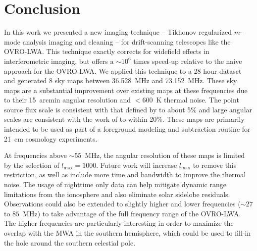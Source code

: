\documentclass[twocolumn]{aastex61}
\begin{document}

\section{Conclusion}\label{sec:conclusion}

In this work we presented a new imaging technique -- Tikhonov regularized $m$-mode analysis imaging
and cleaning -- for drift-scanning telescopes like the OVRO-LWA.  This technique exactly corrects
for widefield effects in interferometric imaging, but offers a $\sim10^6$ times speed-up relative to
the naive approach for the OVRO-LWA. We applied this technique to a 28 hour dataset and generated 8
sky maps between 36.528~MHz and 73.152~MHz. These sky maps are a substantial improvement over
existing maps at these frequencies due to their 15~arcmin angular resolution and $<600$~K thermal
noise. The point source flux scale is consistent with that defined by \citet{2012MNRAS.423L..30S} to
about 5\% and large angular scales are consistent with the work of \citet{2011A&A...525A.138G} to
within 20\%.  These maps are primarily intended to be used as part of a foreground modeling and
subtraction routine for 21~cm cosmology experiments.

At frequencies above $\sim55$~MHz, the angular resolution of these maps is limited by the selection
of $l_\text{max}=1000$. Future work will increase $l_\text{max}$ to remove this restriction, as well
as include more time and bandwidth to improve the thermal noise. The usage of nighttime only data
can help mitigate dynamic range limitations from the ionosphere and also eliminate solar sidelobe
residuals. Observations could also be extended to slightly higher and lower frequencies ($\sim27$ to
$85$~MHz) to take advantage of the full frequency range of the OVRO-LWA. The higher frequencies are
particularly interesting in order to maximize the overlap with the MWA in the southern hemisphere,
which could be used to fill-in the hole around the southern celestial pole.



\end{document}
